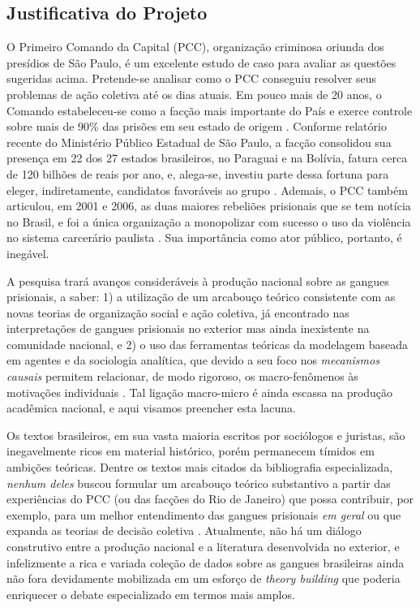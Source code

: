 \documentclass[a4paper,11pt]{article}
\begin{document}
\subsection{Justificativa do Projeto}

O Primeiro Comando da Capital (PCC), organização criminosa oriunda dos presídios de São Paulo, é um excelente estudo de caso para avaliar as questões sugeridas acima. Pretende-se analisar como o PCC conseguiu resolver seus problemas de ação coletiva até os dias atuais. Em pouco mais de 20 anos, o Comando estabeleceu-se como a facção mais importante do País e exerce controle sobre mais de 90\% das prisões em seu estado de origem \citep{biondi2008etica}. Conforme relatório recente do Ministério Público Estadual de São Paulo, a facção consolidou sua presença em 22 dos 27 estados brasileiros, no Paraguai e na Bolívia, fatura cerca de 120 bilhões de reais por ano, e, alega-se, investiu parte dessa fortuna para eleger, indiretamente, candidatos favoráveis ao grupo \citep{veja2013}. Ademais, o PCC também articulou, em 2001 e 2006, as duas maiores rebeliões prisionais que se tem notícia no Brasil, e foi a única organização a monopolizar com sucesso o uso da violência no sistema carcerário paulista  \citep{dias2009guerra}. Sua importância como ator público, portanto, é inegável.

A pesquisa trará avanços consideráveis à produção nacional sobre as gangues prisionais, a saber: 1) a utilização de um arcabouço teórico consistente com as novas teorias de organização social e ação coletiva, já encontrado nas interpretações de gangues prisionais no exterior mas ainda inexistente na comunidade nacional, e 2) o uso das ferramentas teóricas da modelagem baseada em agentes e da sociologia analítica, que devido a seu foco nos \textit{mecanismos causais} permitem relacionar, de modo rigoroso, os macro-fenômenos às motivações individuais \citep{hedstrom1998social}. Tal ligação macro-micro é ainda escassa na produção acadêmica nacional, e aqui visamos preencher esta lacuna.

Os textos brasileiros, em sua vasta maioria escritos por sociólogos e juristas, são inegavelmente ricos em material histórico, porém permanecem tímidos em
ambições teóricas. Dentre os textos mais citados da bibliografia especializada, \textit{nenhum deles} buscou formular um arcabouço teórico substantivo a partir das experiências do PCC (ou das facções do Rio de Janeiro) que possa contribuir, por exemplo, para um melhor entendimento das gangues prisionais \textit{em geral} ou que expanda as teorias de decisão coletiva \citep[365]{dias2011pulverizaccao}. Atualmente, não há um diálogo construtivo entre a produção nacional e a literatura desenvolvida no exterior, e infelizmente a rica e variada coleção de dados sobre as gangues brasileiras ainda não fora devidamente mobilizada em um esforço de \textit{theory building} que poderia enriquecer o debate especializado em termos mais amplos. 
\end{document}
